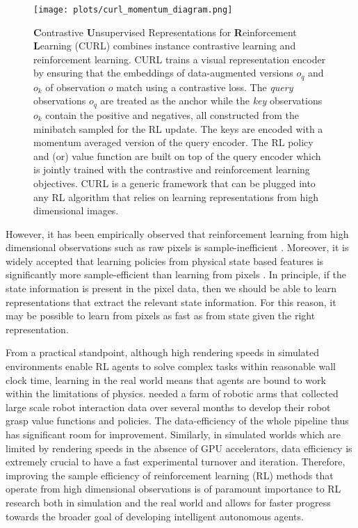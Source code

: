 \documentclass{article}
\begin{document}
\begin{figure}[!ht]
\vskip 0.2in
\begin{center}
\centerline{\texttt{[image: plots/curl\_momentum\_diagram.png]}}

\caption{\textbf{C}ontrastive \textbf{U}nsupervised Representations for \textbf{R}einforcement \textbf{L}earning (CURL) combines instance contrastive learning and reinforcement learning. CURL trains a visual representation encoder by ensuring that the embeddings of data-augmented versions $o_q$ and $o_k$ of observation $o$ match using a contrastive loss. The \emph{query} observations $o_q$ are treated as the anchor while the \emph{key} observations $o_k$ contain the positive and negatives, all constructed from the minibatch sampled for the RL update. The keys are encoded with a momentum averaged version of the query encoder. The RL policy and (or) value function are built on top of the query encoder which is jointly trained with the contrastive and reinforcement learning objectives. CURL is a generic framework that can be plugged into any RL algorithm that relies on learning representations from high dimensional images.}



\label{momentum_encoder}
\end{center}
\vskip -0.2in
\end{figure}


However, it has been empirically observed that reinforcement learning from high dimensional observations such as raw pixels is sample-inefficient \cite{lake2017building, kaiser2019model}. Moreover, it is widely accepted that learning policies from physical state based features is significantly more sample-efficient than learning from pixels \cite{tassa2018deepmind}. In principle, if the state information is present in the pixel data, then we should be able to learn representations that extract the relevant state information. For this reason, it may be possible to learn from pixels as fast as from state given the right representation.

From a practical standpoint, although high rendering speeds in simulated environments enable RL agents to solve complex tasks within reasonable wall clock time, learning in the real world means that agents are bound to work within the limitations of physics. \citet{kalashnikov2018qt} needed a farm of robotic arms that collected large scale robot interaction data over several months to develop their robot grasp value functions and policies. The data-efficiency of the whole pipeline thus has significant room for improvement. Similarly, in simulated worlds which are limited by rendering speeds in the absence of GPU accelerators, data efficiency is extremely crucial to have a fast experimental turnover and iteration. Therefore, improving the sample efficiency of reinforcement learning (RL) methods that operate from high dimensional observations is of paramount importance to RL research both in simulation and the real world and allows for faster progress towards the broader goal of developing intelligent autonomous agents.
\end{document}
